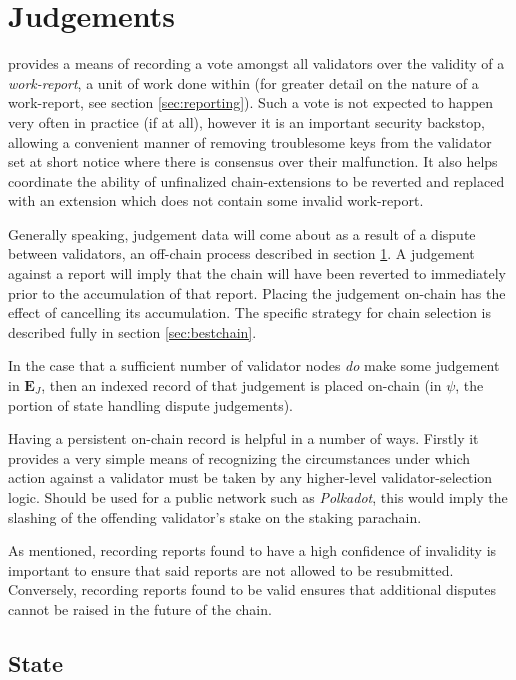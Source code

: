 \section{Judgements}\label{sec:judgements}

\Jam provides a means of recording a vote amongst all validators over the validity of a \emph{work-report}, a unit of work done within \Jam (for greater detail on the nature of a work-report, see section \ref{sec:reporting}). Such a vote is not expected to happen very often in practice (if at all), however it is an important security backstop, allowing a convenient manner of removing troublesome keys from the validator set at short notice where there is consensus over their malfunction. It also helps coordinate the ability of unfinalized chain-extensions to be reverted and replaced with an extension which does not contain some invalid work-report.

Generally speaking, judgement data will come about as a result of a dispute between validators, an off-chain process described in section \ref{sec:judgements}. A judgement against a report will imply that the chain will have been reverted to immediately prior to the accumulation of that report. Placing the judgement on-chain has the effect of cancelling its accumulation. The specific strategy for chain selection is described fully in section \ref{sec:bestchain}.

In the case that a sufficient number of validator nodes \emph{do} make some judgement in $\mathbf{E}_J$, then an indexed record of that judgement is placed on-chain (in $\psi$, the portion of state handling dispute judgements).

Having a persistent on-chain record is helpful in a number of ways. Firstly it provides a very simple means of recognizing the circumstances under which action against a validator must be taken by any higher-level validator-selection logic. Should \Jam be used for a public network such as \emph{Polkadot}, this would imply the slashing of the offending validator's stake on the staking parachain.

As mentioned, recording reports found to have a high confidence of invalidity is important to ensure that said reports are not allowed to be resubmitted. Conversely, recording reports found to be valid ensures that additional disputes cannot be raised in the future of the chain.

\subsection{State}

